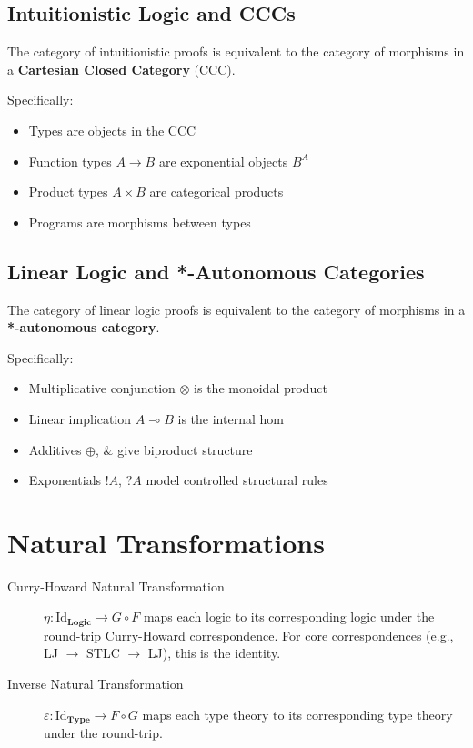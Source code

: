 \subsection*{Intuitionistic Logic and CCCs}

The category of intuitionistic proofs is equivalent to the category of morphisms in a \textbf{Cartesian Closed Category} (CCC).

Specifically:
\begin{itemize}
    \item Types are objects in the CCC
    \item Function types $A \to B$ are exponential objects $B^A$
    \item Product types $A \times B$ are categorical products
    \item Programs are morphisms between types
\end{itemize}

\subsection*{Linear Logic and *-Autonomous Categories}

The category of linear logic proofs is equivalent to the category of morphisms in a \textbf{*-autonomous category}.

Specifically:
\begin{itemize}
    \item Multiplicative conjunction $\otimes$ is the monoidal product
    \item Linear implication $A \multimap B$ is the internal hom
    \item Additives $\oplus$, $\&$ give biproduct structure
    \item Exponentials $!A$, $?A$ model controlled structural rules
\end{itemize}

\section*{Natural Transformations}

\begin{description}
    \item[Curry-Howard Natural Transformation] $\eta: \text{Id}_{\mathbf{Logic}} \to G \circ F$ maps each logic to its corresponding logic under the round-trip Curry-Howard correspondence. For core correspondences (e.g., LJ $\to$ STLC $\to$ LJ), this is the identity.
    \item[Inverse Natural Transformation] $\varepsilon: \text{Id}_{\mathbf{Type}} \to F \circ G$ maps each type theory to its corresponding type theory under the round-trip.
\end{description}

